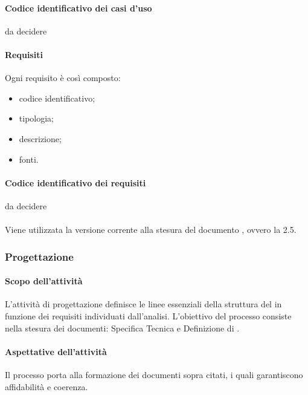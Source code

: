  \paragraph{Codice identificativo dei casi d'uso}
da decidere
 \paragraph{Requisiti}
 Ogni requisito è così composto:
  \begin{itemize}
  \item codice identificativo;
  \item tipologia;
  \item descrizione;
  \item fonti.
 \end{itemize}
 \paragraph{Codice identificativo dei requisiti}
 da decidere
 \paragraph{}
 Viene utilizzata la versione corrente alla stesura del documento , ovvero la 2.5.

\subsubsection{Progettazione}
 \paragraph{Scopo dell'attività}
L'attività di progettazione definisce le linee essenziali della struttura del   in
funzione dei requisiti individuati dall'analisi. L'obiettivo del processo consiste nella stesura dei
documenti: Specifica Tecnica e Definizione di .
 \paragraph{Aspettative dell'attività}
Il processo porta alla formazione dei documenti sopra citati, i quali garantiscono affidabilità e
coerenza.
